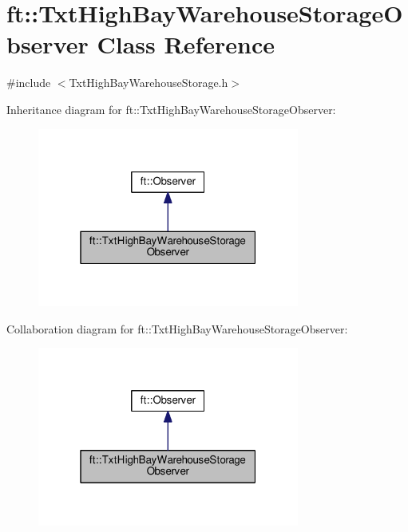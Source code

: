 \hypertarget{classft_1_1_txt_high_bay_warehouse_storage_observer}{}\section{ft\+:\+:Txt\+High\+Bay\+Warehouse\+Storage\+Observer Class Reference}
\label{classft_1_1_txt_high_bay_warehouse_storage_observer}


{\ttfamily \#include $<$Txt\+High\+Bay\+Warehouse\+Storage.\+h$>$}



Inheritance diagram for ft\+:\+:Txt\+High\+Bay\+Warehouse\+Storage\+Observer\+:
\nopagebreak
\begin{figure}[H]
\begin{center}
\leavevmode
\includegraphics[width=244pt]{classft_1_1_txt_high_bay_warehouse_storage_observer__inherit__graph}
\end{center}
\end{figure}


Collaboration diagram for ft\+:\+:Txt\+High\+Bay\+Warehouse\+Storage\+Observer\+:
\nopagebreak
\begin{figure}[H]
\begin{center}
\leavevmode
\includegraphics[width=244pt]{classft_1_1_txt_high_bay_warehouse_storage_observer__coll__graph}
\end{center}
\end{figure}
